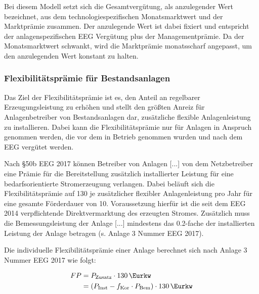 Bei diesem Modell setzt sich die Gesamtvergütung, als anzulegender Wert bezeichnet, aus dem technologiespezifischen Monatsmarktwert und der Marktprämie zusammen. Der anzulegende Wert ist dabei fixiert und entspricht der anlagenspezifischen \gls{EEG} Vergütung plus der Managementprämie. Da der Monatsmarktwert schwankt, wird die Marktprämie monatsscharf angepasst, um den anzulegenden Wert konstant zu halten. \parencite{NKGH-DV}


\subsubsection{Flexibilitätsprämie für Bestandsanlagen}\label{chap:law_FP}

Das Ziel der Flexibilitätsprämie ist es, den Anteil an regelbarer Erzeugungsleistung zu erhöhen und stellt den größten Anreiz für Anlagenbetreiber von Bestandsanlagen dar, zusätzliche flexible Anlagenleistung zu installieren. Dabei kann die Flexibilitätsprämie nur für Anlagen in Anspruch genommen werden, die vor dem  in Betrieb genommen wurden und nach dem \gls{EEG} vergütet werden.\smallskip

Nach \S 50b \gls{EEG} \SI{2017}{\relax} können \glqq Betreiber von Anlagen [...] von dem Netzbetreiber eine Prämie für die Bereitstellung zusätzlich installierter Leistung für eine bedarfsorientierte Stromerzeugung verlangen.\grqq{} Dabei beläuft sich die Flexibilitätsprämie auf \SI{130}{\sieuro} je \si{\kw} zusätzlicher flexibler Anlagenleistung pro Jahr für eine gesamte Förderdauer von \SI{10}{\Jahren}. Voraussetzung hierfür ist die seit dem \gls{EEG} \SI{2014}{\relax} verpflichtende Direktvermarktung des erzeugten Stromes. Zusätzlich muss \glqq{}die Bemessungsleistung der Anlage [...] mindestens das \SI{0.2}{\relax}-fache der installierten Leistung der Anlage\grqq{} betragen (s. Anlage 3 Nummer  \gls{EEG} \SI{2017}{\relax}). \parencite{BJV2014} \parencite{DanielGromke2019}\smallskip

Die individuelle Flexibilitätsprämie einer Anlage berechnet sich nach Anlage 3 Nummer  \gls{EEG} \SI{2017}{\relax} wie folgt:

\begin{equation}
\begin{split}
	FP & = P_{\text{Zusatz}} \cdot \SI{130}{\Eurkw} \\
	& = \left(P_{\text{Inst}} - f_{\text{Kor}} \cdot P_{\text{Bem}}\right) \cdot \SI{130}{\Eurkw}
\end{split}
\end{equation}

